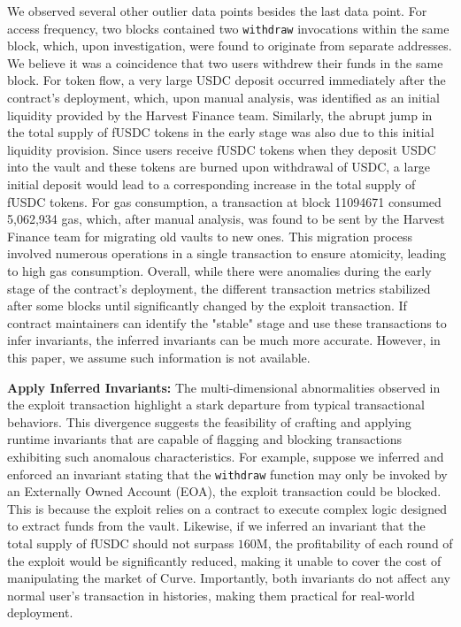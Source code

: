 We observed several other outlier data points besides the last data point. 
For access frequency, two blocks contained two \texttt{withdraw} invocations within the same block, which, 
upon investigation, were found to originate from separate addresses. 
We believe it was a coincidence that two users withdrew their funds in the same block. 
For token flow, a very large USDC deposit occurred immediately after the contract's deployment, 
which, upon manual analysis, was identified as an initial liquidity provided by the Harvest Finance team. 
Similarly, the abrupt jump in the total supply of fUSDC tokens in the early stage was also due to this 
initial liquidity provision. 
Since users receive fUSDC tokens when they deposit USDC into the vault and these tokens are burned upon withdrawal of USDC,
a large initial deposit would lead to a corresponding increase in the total supply of fUSDC tokens.
For gas consumption, a transaction at block 11094671 consumed 5,062,934 gas, which, 
after manual analysis, was found to be sent by the Harvest Finance team for migrating old vaults to new ones. 
This migration process involved numerous operations in a single transaction to ensure atomicity, leading to high gas consumption. 
Overall, while there were anomalies during the early stage of the contract's deployment, 
the different transaction metrics stabilized after some blocks until significantly changed by the exploit transaction. 
If contract maintainers can identify the "stable" stage and use these transactions to infer invariants, 
the inferred invariants can be much more accurate. 
However, in this paper, we assume such information is not available.










\noindent \textbf{Apply Inferred Invariants:} The multi-dimensional
abnormalities observed in the exploit transaction highlight a stark departure
from typical transactional behaviors. This divergence suggests the feasibility
of crafting and applying runtime invariants that are capable of flagging and
blocking transactions exhibiting such anomalous characteristics. For example,
suppose we inferred and enforced an invariant stating that the
\texttt{withdraw} function may only be invoked by an Externally Owned Account (EOA),
the exploit transaction could be blocked. This is because the exploit relies on a
contract to execute complex logic designed to
extract funds from the vault. Likewise, if we inferred an invariant that the total
supply of fUSDC should not surpass $160$M, the profitability of each round of the exploit
would be significantly reduced, making it unable to cover the cost of manipulating
the market of Curve.
Importantly, both invariants do not affect any normal user's
transaction in histories, making them practical for real-world deployment.

